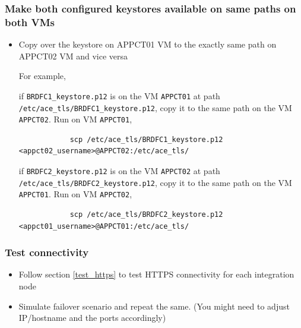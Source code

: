 \documentclass{article}
\begin{document}
    \subsubsection{Make both configured keystores available on same paths on both VMs} 
    \begin{itemize}
        \item Copy over the keystore on APPCT01 VM to the exactly same path on APPCT02 VM and vice versa

        For example,
        
        if \lstinline{BRDFC1_keystore.p12} is on the VM \texttt{APPCT01} at path \lstinline{/etc/ace_tls/BRDFC1_keystore.p12}, copy it to the same path on the VM \texttt{APPCT02}. Run on VM \texttt{APPCT01},
        \begin{lstlisting}
            scp /etc/ace_tls/BRDFC1_keystore.p12 <appct02_username>@APPCT02:/etc/ace_tls/
        \end{lstlisting}
        
        if \lstinline{BRDFC2_keystore.p12} is on the VM \texttt{APPCT02} at path \lstinline{/etc/ace_tls/BRDFC2_keystore.p12}, copy it to the same path on the VM \texttt{APPCT01}. Run on VM \texttt{APPCT02},
        \begin{lstlisting}
            scp /etc/ace_tls/BRDFC2_keystore.p12 <appct01_username>@APPCT01:/etc/ace_tls/
        \end{lstlisting}
    \end{itemize}

    \subsubsection{Test connectivity}
    \begin{itemize}
        \item Follow section \ref{test_https} to test HTTPS connectivity for each integration node
        \item Simulate failover scenario and repeat the same. (You might need to adjust IP/hostname and the ports accordingly)
    \end{itemize}
\end{document}
